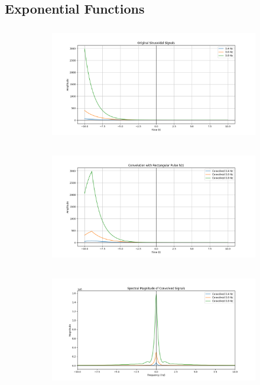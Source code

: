 \documentclass[a4paper,12pt]{article}
\begin{document}
\subsection*{Exponential Functions}
\begin{figure}[H]
    \centering
    \begin{subfigure}{0.5\textwidth}
        \centering
        \includegraphics[height=5cm]{figs/exp1.png}
    \end{subfigure}%
    \begin{subfigure}{0.5\textwidth}
        \centering
        \includegraphics[height=5cm]{figs/exp2.png}
    \end{subfigure}
    \begin{subfigure}{0.5\textwidth}
        \centering
        \includegraphics[height=5cm]{figs/exp3.png}
    \end{subfigure}%
\end{figure}
\end{document}
